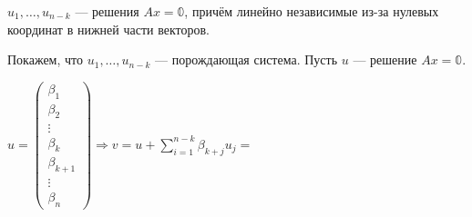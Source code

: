 \begin{itemize}
          \(u_1, \ldots, u_{n - k}\) --- решения \(Ax = \mathbb{0}\), причём линейно независимые из-за нулевых координат в нижней части векторов.

          Покажем, что \(u_1, \ldots, u_{n - k}\) --- порождающая система. Пусть \(u\) --- решение \(Ax = \mathbb{0}\).

          \(u =
          \begin{pmatrix}
              \beta_1       \\
              \beta_2       \\
              \vdots        \\
              \beta_k       \\
              \beta_{k + 1} \\
              \vdots        \\
              \beta_n
          \end{pmatrix} \Rightarrow v = u + \sum\limits_{i = 1}^{n - k} \beta_{k + j} u_j =\)


\end{itemize}
